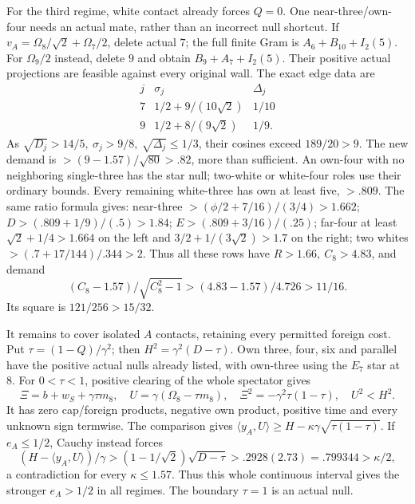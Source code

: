 \documentclass[11pt]{article}
\theoremstyle{definition}
\theoremstyle{remark}
\newcommand{\ip}[2]{\langle #1,#2\rangle}
\begin{document}
For the third regime, white contact already forces \(Q=0\).
One near-three/own-four needs an actual mate, rather than an
incorrect null shortcut.
If \(v_A=\Omega_8/\sqrt2+\Omega_7/2\), delete actual \(7\);
the full finite Gram is \(A_6+B_{10}+I_2(5)\).
For \(\Omega_9/2\) instead, delete \(9\) and obtain
\(B_9+A_7+I_2(5)\).
Their positive actual projections are feasible against every original
wall. The exact edge data are
\[
\begin{array}{c|c|c}
j&\sigma_j&\Delta_j\\ \hline
7&1/2+9/(10\sqrt2)&1/10\\
9&1/2+8/(9\sqrt2)&1/9 .
\end{array}
\]
As \(\sqrt{D_j}>14/5,\ \sigma_j>9/8,\ \sqrt{\Delta_j}\leq1/3\),
their cosines exceed \(189/20>9\).
The new demand is \(>(9-1.57)/\sqrt{80}>.82\), more than sufficient.
An own-four with no neighboring single-three has the star null;
two-white or white-four roles use their ordinary bounds.
Every remaining white-three has own at least five, \(>.809\).
The same ratio formula gives:
near-three \(>(\phi/2+7/16)/(3/4)>1.662\);
\(D>(.809+1/9)/(.5)>1.84\);
\(E>(.809+3/16)/(.25)\);
far-four at least \(\sqrt2+1/4>1.664\) on the left and
\(3/2+1/(3\sqrt2)>1.7\) on the right;
two whites \(>(.7+17/144)/.344>2\).
Thus all these rows have \(R>1.66,\ C_8>4.83\), and demand
\[
 (C_8-1.57)/\sqrt{C_8^2-1}>
 (4.83-1.57)/4.726>11/16 .
\]
Its square is \(121/256>15/32\).

It remains to cover isolated \(A\) contacts, retaining every permitted
foreign cost. Put \(\tau=(1-Q)/\gamma^2\); then
\(H^2=\gamma^2(D-\tau)\).
Own three, four, six and parallel have the positive actual nulls
already listed, with own-three using the \(E_7\) star at \(8\).
For \(0<\tau<1\), positive clearing of the whole spectator gives
\[
 \Xi=b+w_S+\gamma\tau m_8,\quad
 U=\gamma(\Omega_8-\tau m_8),\quad
 \Xi^2=-\gamma^2\tau(1-\tau),\quad U^2<H^2 .
\]
It has zero cap/foreign products, negative own product, positive time
and every unknown sign termwise.
The comparison gives \(\ip{y_A}U\geq H-\kappa\gamma
\sqrt{\tau(1-\tau)}\).
If \(e_A\leq1/2\), Cauchy instead forces
\[
 (H-\ip{y_A}U)/\gamma
 >(1-1/\sqrt2)\sqrt{D-\tau}
 >.2928(2.73)=.799344>\kappa/2 ,
\]
a contradiction for every \(\kappa\leq1.57\).
Thus this whole continuous interval gives the stronger \(e_A>1/2\)
in all regimes. The boundary \(\tau=1\) is an actual null.
\end{document}
